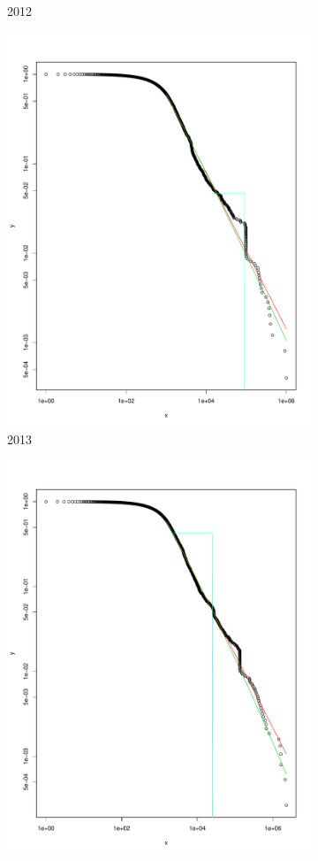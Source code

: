 \documentclass[preprint,12pt]{elsarticle}
\begin{document}
\begin{figure}[H]
\begin{subfigure}{.3\textwidth}
  \caption{2012}
  \label{fig:2012o}
\end{subfigure}
\begin{subfigure}{.3\textwidth}
  \centering
  \includegraphics[width=.8\linewidth]{Bitcoin-graphs/deg-dist-out-2013.pdf}  
  \caption{2013}
  \label{fig:2013o}
\end{subfigure}
\begin{subfigure}{.3\textwidth}
  \centering
  \includegraphics[width=.8\linewidth]{Bitcoin-graphs/deg-dist-out-2014.pdf}  

\end{subfigure}
\end{figure}
\end{document}

